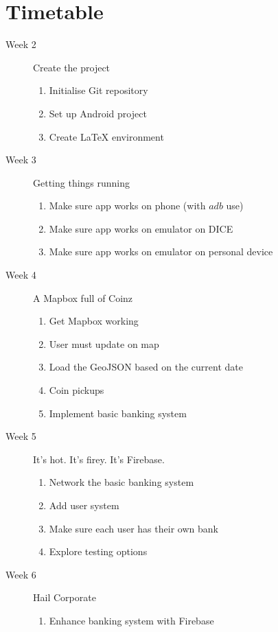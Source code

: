 \documentclass[a4paper]{article}
\begin{document}
\section{Timetable}
\begin{description}
    \item[Week 2] Create the project
        \begin{enumerate}
            \item Initialise Git repository
            \item Set up Android project
            \item Create \LaTeX{} environment
        \end{enumerate}
    \item[Week 3] Getting things running
        \begin{enumerate}
            \item Make sure app works on phone (with $adb$ use)
            \item Make sure app works on emulator on DICE
            \item Make sure app works on emulator on personal device
        \end{enumerate}
    \item[Week 4] A Mapbox full of Coinz
        \begin{enumerate}
            \item Get Mapbox working
            \item User must update on map
            \item Load the GeoJSON based on the current date
            \item Coin pickups
            \item Implement basic banking system
        \end{enumerate}
    \item[Week 5] It's hot. It's firey. It's Firebase.
        \begin{enumerate}
            \item Network the basic banking system
            \item Add user system
            \item Make sure each user has their own bank
            \item Explore testing options
        \end{enumerate}
    \item[Week 6] Hail Corporate
        \begin{enumerate}
            \item Enhance banking system with Firebase

\end{enumerate}
\end{description}
\end{document}
